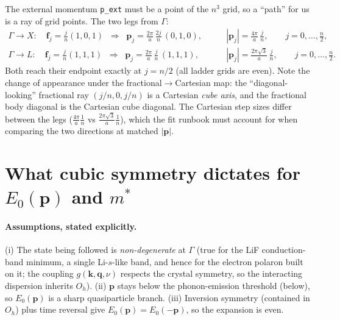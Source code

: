 \documentclass[11pt]{article}
\newcommand{\kv}{\mathbf{k}}
\newcommand{\qv}{\mathbf{q}}
\newcommand{\pv}{\mathbf{p}}
\begin{document}
The external momentum \texttt{p\_ext} must be a point of the $n^{3}$ grid, so a
``path'' for us is a ray of grid points. The two legs from $\Gamma$:
\begin{align}
\Gamma\to X:\quad
\mathbf{f}_{j}=\tfrac{j}{n}(1,0,1)
\;\;\Rightarrow\;\;
\pv_{j}=\tfrac{2\pi}{a}\,\tfrac{2j}{n}\,(0,1,0),
&\qquad |\pv_{j}|=\tfrac{4\pi}{a}\,\tfrac{j}{n},
\qquad j=0,\dots,\tfrac{n}{2}, \\[2pt]
\Gamma\to L:\quad
\mathbf{f}_{j}=\tfrac{j}{n}(1,1,1)
\;\;\Rightarrow\;\;
\pv_{j}=\tfrac{2\pi}{a}\,\tfrac{j}{n}\,(1,1,1),
&\qquad |\pv_{j}|=\tfrac{2\pi\sqrt{3}}{a}\,\tfrac{j}{n},
\qquad j=0,\dots,\tfrac{n}{2}.
\end{align}
Both reach their endpoint exactly at $j=n/2$ (all ladder grids are even). Note the
change of appearance under the fractional$\to$Cartesian map: the ``diagonal-looking''
fractional ray $(j/n,0,j/n)$ is a Cartesian \emph{cube axis}, and the fractional body
diagonal is the Cartesian cube diagonal. The Cartesian step sizes differ between the
legs ($\tfrac{4\pi}{a}\tfrac1n$ vs $\tfrac{2\pi\sqrt3}{a}\tfrac1n$), which the fit
runbook must account for when comparing the two directions at matched $|\pv|$.

\section{What cubic symmetry dictates for $E_{0}(\pv)$ and $m^{*}$}
\label{sec:mass}

\paragraph{Assumptions, stated explicitly.} (i) The state being followed is
\emph{non-degenerate} at $\Gamma$ (true for the LiF conduction-band minimum, a single
Li-$s$-like band, and hence for the electron polaron built on it; the coupling
$g(\kv,\qv,\nu)$ respects the crystal symmetry, so the interacting dispersion inherits
$O_{h}$). (ii) $\pv$ stays below the phonon-emission threshold (below), so $E_{0}(\pv)$
is a sharp quasiparticle branch. (iii) Inversion symmetry (contained in $O_{h}$) plus
time reversal give $E_{0}(\pv)=E_{0}(-\pv)$, so the expansion is even.
\end{document}
